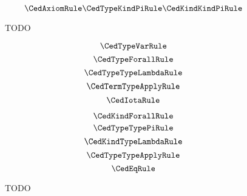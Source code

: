 
\begin{figure}
    \centering
    $$\CedAxiomRule \CedTypeKindPiRule \CedKindKindPiRule$$
    \caption{
        TODO
    }
    \label{fig:4:kind}
\end{figure}


\begin{figure}
    \centering
    \begin{minipage}{0.5\textwidth}
        $$\CedTypeVarRule$$
        $$\CedTypeForallRule$$
        $$\CedTypeTypeLambdaRule$$
        $$\CedTermTypeApplyRule$$
        $$\CedIotaRule$$
    \end{minipage}%
    \begin{minipage}{0.5\textwidth}
        $$\CedKindForallRule$$
        $$\CedTypeTypePiRule$$
        $$\CedKindTypeLambdaRule$$
        $$\CedTypeTypeApplyRule$$
        $$\CedEqRule$$
    \end{minipage}%
    \caption{
        TODO
    }
    \label{fig:4:type}
\end{figure}
